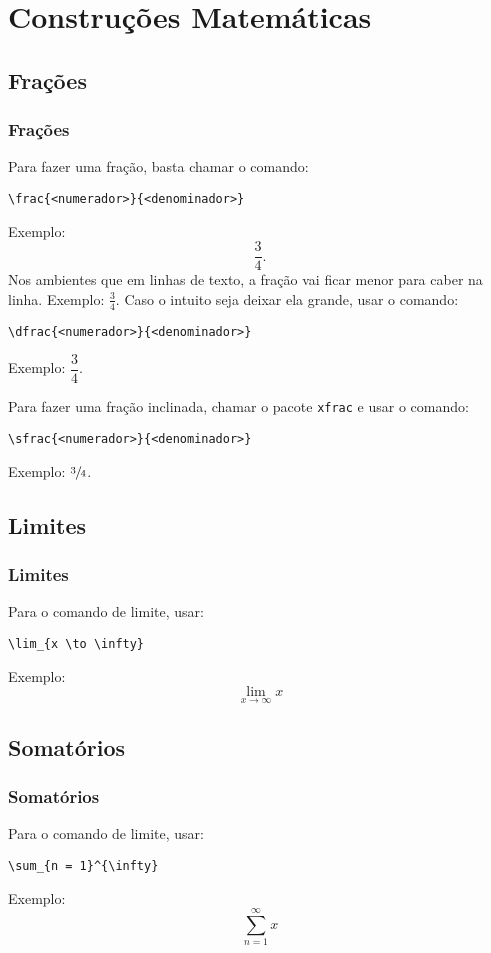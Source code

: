 \documentclass[brazilian]{beamer}
\begin{document}
\section{Construções Matemáticas}
\subsection{Frações}
\begin{frame}[fragile]
    \frametitle{Frações}
\small
Para fazer uma fração, basta chamar o comando:
\begin{lstlisting}[style=myStyleLatex]
\frac{<numerador>}{<denominador>}
\end{lstlisting}
Exemplo: \[\frac{3}{4}.\]
Nos ambientes que em linhas de texto, a fração vai ficar menor para caber na linha. Exemplo: \(\frac{3}{4}\). Caso o intuito seja deixar ela grande, usar o comando:
\begin{lstlisting}[style=myStyleLatex]
\dfrac{<numerador>}{<denominador>}
\end{lstlisting}
Exemplo: \(\dfrac{3}{4}\).

Para fazer uma fração inclinada, chamar o pacote \texttt{xfrac} e usar o comando:
\begin{lstlisting}[style=myStyleLatex]
\sfrac{<numerador>}{<denominador>}
\end{lstlisting}
Exemplo: \(\sfrac{3}{4}\).

\end{frame}

\subsection{Limites}
\begin{frame}[fragile]
    \frametitle{Limites}

Para o comando de limite, usar:
\begin{lstlisting}[style=myStyleLatex]
\lim_{x \to \infty} 
\end{lstlisting}
Exemplo: \[\lim_{x \to \infty} x \]

\end{frame}

\subsection{Somatórios}

\begin{frame}[fragile]
    \frametitle{Somatórios}

Para o comando de limite, usar:
\begin{lstlisting}[style=myStyleLatex]
\sum_{n = 1}^{\infty} 
\end{lstlisting}
Exemplo: \[\sum_{n = 1}^{\infty} x \]

\end{frame}
\end{document}
